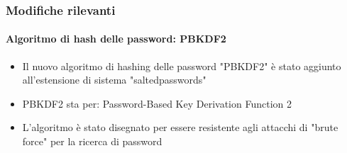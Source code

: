 \begin{frame}[fragile]
	\frametitle{Modifiche rilevanti}
	\framesubtitle{Algoritmo di hash delle password: PBKDF2}

	\begin{itemize}

		\item Il nuovo algoritmo di hashing delle password "PBKDF2" è stato aggiunto all'estensione di sistema "saltedpasswords"

		\item PBKDF2 sta per: Password-Based Key Derivation Function 2

		\item L'algoritmo è stato disegnato per essere resistente agli attacchi di "brute force" per la ricerca di password

	\end{itemize}

\end{frame}

